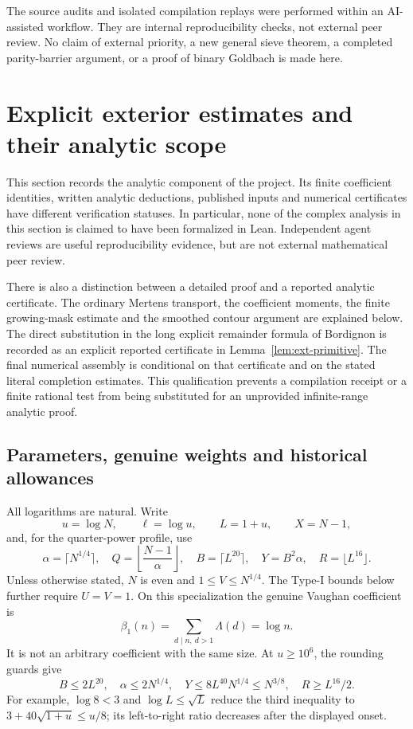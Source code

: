 \documentclass[11pt,a4paper]{article}
\theoremstyle{definition}
\theoremstyle{remark}
\begin{document}
The source audits and isolated compilation replays were performed
within an AI-assisted workflow.  They are internal reproducibility
checks, not external peer review.  No claim of external priority,
a new general sieve theorem, a completed parity-barrier argument,
or a proof of binary Goldbach is made here.


\section{Explicit exterior estimates and their analytic scope}
\label{sec:exterior}

This section records the analytic component of the project. Its finite
coefficient identities, written analytic deductions, published inputs and
numerical certificates have different verification statuses. In particular,
none of the complex analysis in this section is claimed to have been
formalized in Lean. Independent agent reviews are useful reproducibility
evidence, but are not external mathematical peer review.

There is also a distinction between a detailed proof and a reported
analytic certificate. The ordinary Mertens transport, the coefficient
moments, the finite growing-mask estimate and the smoothed contour argument
are explained below. The direct substitution in the long explicit remainder
formula of Bordignon is recorded as an explicit reported certificate in
Lemma~\ref{lem:ext-primitive}. The final numerical assembly is conditional
on that certificate and on the stated literal completion estimates. This
qualification prevents a compilation receipt or a finite rational test from
being substituted for an unprovided infinite-range analytic proof.

\subsection{Parameters, genuine weights and historical allowances}

All logarithms are natural. Write
\[
 u=\log N,\qquad \ell=\log u,\qquad L=1+u,
 \qquad X=N-1,
\]
and, for the quarter-power profile, use
\[
 \alpha=\lceil N^{1/4}\rceil,\quad
 Q=\left\lfloor\frac{N-1}{\alpha}\right\rfloor,\quad
 B=\lceil L^{20}\rceil,\quad Y=B^2\alpha,\quad
 R=\lfloor L^{16}\rfloor.
\]
Unless otherwise stated, $N$ is even and $1\leq V\leq N^{1/4}$.
The Type-I bounds below further require $U=V=1$. On this specialization
the genuine Vaughan coefficient is
\[
 \beta_1(n)=\sum_{d\mid n,\ d>1}\Lambda(d)=\log n.
\]
It is not an arbitrary coefficient with the same size. At $u\geq10^6$,
the rounding guards give
\[
 B\leq2L^{20},\quad \alpha\leq2N^{1/4},\quad
 Y\leq8L^{40}N^{1/4}\leq N^{3/8},\quad
 R\geq L^{16}/2.
\]
For example, $\log8<3$ and $\log L\leq\sqrt L$ reduce the third
inequality to $3+40\sqrt{1+u}\leq u/8$; its left-to-right ratio
decreases after the displayed onset.
\end{document}
